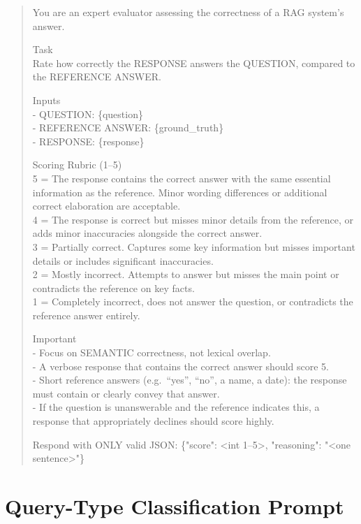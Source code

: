 \begin{quote}
\small\ttfamily\sloppy
You are an expert evaluator assessing the correctness of a RAG system's answer.

\medskip
Task\\
Rate how correctly the RESPONSE answers the QUESTION, compared to the REFERENCE ANSWER.

\medskip
Inputs\\
- QUESTION: \{question\}\\
- REFERENCE ANSWER: \{ground\_truth\}\\
- RESPONSE: \{response\}

\medskip
Scoring Rubric (1--5)\\
5 = The response contains the correct answer with the same essential information
as the reference. Minor wording differences or additional correct elaboration
are acceptable.\\
4 = The response is correct but misses minor details from the reference, or adds
minor inaccuracies alongside the correct answer.\\
3 = Partially correct. Captures some key information but misses important
details or includes significant inaccuracies.\\
2 = Mostly incorrect. Attempts to answer but misses the main point or
contradicts the reference on key facts.\\
1 = Completely incorrect, does not answer the question, or contradicts the
reference answer entirely.

\medskip
Important\\
- Focus on SEMANTIC correctness, not lexical overlap.\\
- A verbose response that contains the correct answer should score 5.\\
- Short reference answers (e.g.\ ``yes'', ``no'', a name, a date): the response
  must contain or clearly convey that answer.\\
- If the question is unanswerable and the reference indicates this, a response
  that appropriately declines should score highly.

\medskip
Respond with ONLY valid JSON: \{"score": \textless int 1--5\textgreater, "reasoning": "\textless one sentence\textgreater"\}
\end{quote}

\section{Query-Type Classification Prompt}
\label{app:qt_prompt}

